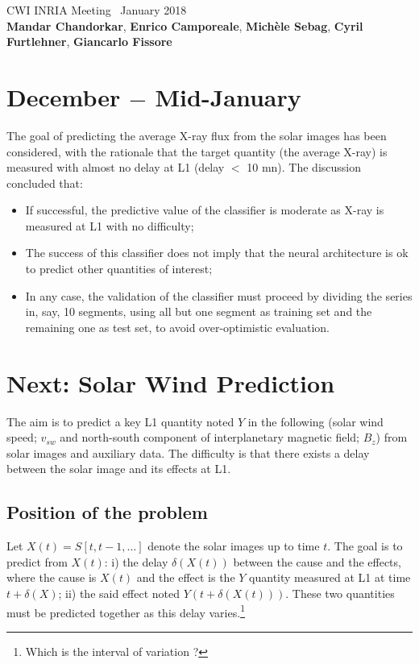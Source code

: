 \documentclass[]{article}
\theoremstyle{definition}
\begin{document}
\begin{center}
{\Large CWI INRIA Meeting \ January 2018}\\
\textbf{Mandar Chandorkar}, \textbf{Enrico Camporeale}, \textbf{Mich\`ele Sebag}, \textbf{Cyril Furtlehner}, \textbf{Giancarlo Fissore}
\end{center}

\vspace{0.2 cm}
\section{December  $-$ Mid-January}
The goal of predicting the average X-ray flux from the solar images has been considered, with the rationale that the target quantity (the average X-ray) is measured with almost no delay at L1 (delay $<$ 10 mn). The discussion concluded that:
\begin{itemize}
\item If successful, the predictive value of the classifier is moderate as X-ray is measured at L1 with no difficulty;
\item The success of this classifier does not imply that the neural architecture is ok to predict other quantities of interest;
\item In any case, the validation of the classifier must proceed by dividing the series in, say, 10 segments, using all but one segment as training set and the remaining one as test set, to avoid over-optimistic evaluation.
\end{itemize}


\section{Next: Solar Wind Prediction}

The aim is to predict a key L1 quantity noted $Y$ in the following (solar wind speed; $v_{sw}$ and north-south component of interplanetary magnetic field; $B_z$) from solar images and auxiliary data. The difficulty is that there exists a delay between the solar image and its effects at L1.


\subsection{Position of the problem}\label{assum}
Let $X(t) = S[t, t-1, \ldots]$ denote the solar images up to time $t$. The goal is to predict from $X(t)$: i) the delay $\delta(X(t))$ between the cause and the effects, where the cause is $X(t)$ and the effect is the $Y$ quantity measured at L1 at time $t + \delta(X)$; ii) the said effect noted $Y(t + \delta(X(t)))$.
These two quantities must be predicted together as this delay varies.\footnote{Which is the interval of variation ?}
\end{document}
